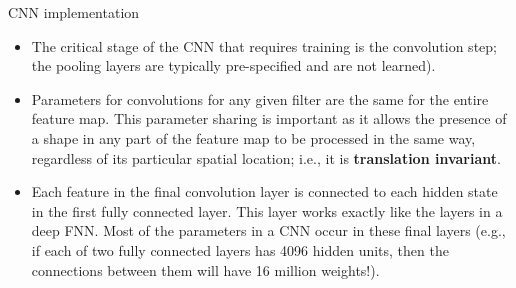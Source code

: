 \documentclass{beamer}
\begin{document}
\begin{frame}{CNN implementation}
\begin{itemize}
\item The critical stage of the CNN that requires training is the convolution step; the pooling layers are typically pre-specified and are not learned).
\item Parameters for convolutions for any given filter are the same for the entire feature map. This parameter sharing is important as it allows the presence of a shape in any part of the feature map to be processed in the same way, regardless of its particular spatial location; i.e., it is \textbf{translation invariant}.
\item Each feature in the final convolution layer is connected to each hidden state in the first fully connected layer. This layer works exactly like the layers in a deep FNN. Most of the parameters in a CNN occur in these final layers (e.g., if each of two fully connected layers has 4096 hidden units, then the connections between them will have 16 million weights!).
\end{itemize}
\end{frame}
\end{document}
